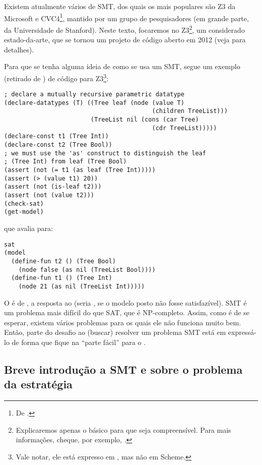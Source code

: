 \documentclass{article}
\begin{document}
Existem atualmente vários  de SMT, dos quais os mais
populares são Z3 da Microsoft e CVC4\footnote{De
  .}, mantido por um grupo de
pesquisadores (em grande parte, da Universidade de Stanford). Neste
texto, focaremos no Z3\footnote{Explicaremos apenas o básico para que
  seja compreensível. Para mais informações, cheque, por exemplo,
  \cite{z3}.}, um  considerado
estado-da-arte, que se tornou um projeto de código aberto em 2012
(veja \cite{leo} para detalhes).

Para que se tenha alguma ideia de como se usa um  SMT,
segue um exemplo (retirado de \cite{tuto}) de código para
Z3\footnote{Vale notar, ele está expresso em , mas
  não em Scheme.}:

\begin{lstlisting}
; declare a mutually recursive parametric datatype
(declare-datatypes (T) ((Tree leaf (node (value T)
                                         (children TreeList)))
                        (TreeList nil (cons (car Tree)
                                         (cdr TreeList)))))
(declare-const t1 (Tree Int))
(declare-const t2 (Tree Bool))
; we must use the 'as' construct to distinguish the leaf
; (Tree Int) from leaf (Tree Bool)
(assert (not (= t1 (as leaf (Tree Int)))))
(assert (> (value t1) 20))
(assert (not (is-leaf t2)))
(assert (not (value t2)))
(check-sat)
(get-model)
\end{lstlisting}

\noindent que avalia para:

\begin{lstlisting}
sat
(model
  (define-fun t2 () (Tree Bool)
    (node false (as nil (TreeList Bool))))
  (define-fun t1 () (Tree Int)
    (node 21 (as nil (TreeList Int)))))
\end{lstlisting}

O  é de , a resposta ao
 (seria , se o modelo posto não
fosse satisfazível). SMT é um problema mais difícil do que SAT, que é
NP-completo. Assim, como é de se esperar, existem vários problemas
para os quais ele não funciona muito bem. Então, parte do desafio ao
(buscar) resolver um problema SMT está em expressá-lo de forma que
fique na ``parte fácil'' para o .

\subsection{Breve introdução a SMT e sobre o problema da estratégia}
\end{document}
